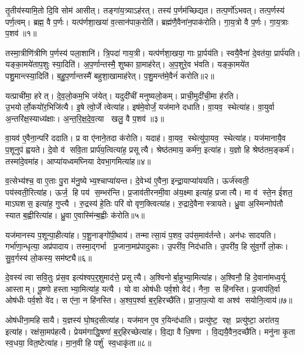 तृ॒तीय॑स्यामि॒तो दि॒वि सोम॑ आसीत्।
तङ्गा॑य॒त्र्याऽह॑रत्।
तस्य॑ प॒र्णम॑च्छिद्यत।
तत्प॒र्णो॑ऽभवत्।
तत्प॒र्णस्य॑ पर्ण॒त्वम्।
ब्रह्म॒ वै प॒र्णः।
यत्प॑र्णशा॒खया॑ व॒त्सान॑पाक॒रोति॑।
ब्रह्म॑णै॒वैना॑न॒पाक॑रोति।
गा॒य॒त्रो वै प॒र्णः।
गा॒य॒त्राः प॒शव॑॥१॥

तस्मा॒त्रीणि॑त्रीणि प॒र्णस्य॑ पला॒शानि॑।
त्रि॒पदा॑ गाय॒त्री।
यत्प॑र्णशा॒खया॒ गाः प्रा॒र्पय॑ति।
स्वयै॒वैना॑ दे॒वत॑या॒ प्रार्प॑यति।
यङ्का॒मये॑ताप॒शुः स्या॒दिति॑।
अ॒प॒र्णान्तस्मै॒ शुष्काग्रा॒माह॑रेत्।
अ॒प॒शुरे॒व भ॑वति।
यङ्का॒मये॑त पशु॒मान्त्स्या॒दिति॑।
ब॒हु॒प॒र्णान्तस्मै॑ बहुशा॒खामाह॑रेत्।
प॒शु॒मन्त॑मे॒वैनं॑ करोति॥२॥

यत्प्राची॑मा॒ हरेत्।
दे॒व॒लो॒कम॒भि ज॑येत्।
यदुदी॑चीं मनुष्यलो॒कम्।
प्राची॒मुदी॑ची॒मा ह॑रति।
उ॒भयोर्लो॒कयो॑र॒भिजि॑त्यै।
इ॒षे त्वो॒र्जे त्वेत्या॑ह।
इष॑मे॒वोर्जं॒ यज॑माने दधाति।
वा॒यव॒ स्थेत्या॑ह।
वा॒युर्वा अ॒न्तरि॑क्ष॒स्याध्य॑क्षाः।
अ॒न्त॒रि॒क्ष॒दे॒व॒त्या खलु॒ वै प॒शव॑॥३॥

वा॒यव॑ ए॒वैना॒न्परि॑ ददाति।
प्र वा ए॑नाने॒तदा क॑रोति।
यदाह॑।
वा॒यव॒ स्थेत्यु॑पा॒यव॒ स्थेत्या॑ह।
यज॑मानायै॒व प॒शूनुप॑ ह्वयते।
दे॒वो व॑ सवि॒ता प्रार्प॑य॒त्वित्या॑ह॒ प्रसूत्यै।
श्रेष्ठ॑तमाय॒ कर्म॑ण॒ इत्या॑ह।
य॒ज्ञो हि श्रेष्ठ॑तम॒ङ्कर्म॑।
तस्मा॑दे॒वमा॑ह।
आप्या॑यध्वमघ्निया देवभा॒गमित्या॑ह॥४॥

व॒त्सेभ्य॑श्च॒ वा ए॒ताः पु॒रा म॑नु॒ष्येभ्य॒श्चाप्या॑यन्त।
दे॒वेभ्य॑ ए॒वैना॒ इन्द्रा॒याप्या॑ययति।
ऊर्ज॑स्वती॒ पय॑स्वती॒रित्या॑ह।
ऊर्ज॒ हि पय॑ स॒म्भर॑न्ति।
प्र॒जाव॑तीरनमी॒वा अ॑य॒क्ष्मा इत्या॑ह॒ प्रजात्यै।
मा व॑ स्ते॒न ई॑शत॒ माऽघशस॒ इत्या॑ह॒ गुप्त्यै।
रु॒द्रस्य॑ हे॒तिः परि॑ वो वृण॒क्त्वित्या॑ह।
रु॒द्रादे॒वैनास्त्रायते।
ध्रु॒वा अ॒स्मिन्गोप॑तौ स्यात ब॒ह्वीरित्या॑ह।
ध्रु॒वा ए॒वास्मि॑न्ब॒ह्वीः क॑रोति॥५॥

यज॑मानस्य प॒शून्पा॒हीत्या॑ह।
प॒शू॒नाङ्गो॑पी॒थाय॑।
तन्मात्सा॒यं प॒शव॒ उप॑स॒माव॑र्तन्ते।
अन॑धः सादयति।
गर्भा॑णा॒न्धृत्या॒ अप्र॑पादाय।
तस्मा॒द्गर्भा प्र॒जाना॒मप्र॑पादुकाः।
उ॒परी॑व॒ निद॑धाति।
उ॒परी॑व॒ हि सु॑व॒र्गो लो॒कः।
सु॒व॒र्गस्य॑ लो॒कस्य॒ सम॑ष्ट्यै॥६॥\anuvakamend[प॒शव॑ करोति प॒शवो॑ देवभा॒गमित्या॑ह करोति॒ नव॑ च]

दे॒वस्य॑ त्वा सवि॒तुः प्र॑स॒व इत्य॑श्वप॒र्॒शुमाद॑त्ते॒ प्रसूत्यै।
अ॒श्विनोर्बा॒हुभ्या॒मित्या॑ह।
अ॒श्विनौ॒ हि दे॒वाना॑मध्व॒र्यू आस्ताम्।
पू॒ष्णो हस्ताभ्या॒मित्या॑ह॒ यत्यै।
यो वा ओष॑धीः पर्व॒शो वेद॑।
नैना॒ स हि॑नस्ति।
प्र॒जाप॑ति॒र्वा ओष॑धीः पर्व॒शो वे॑द।
स ए॑ना॒ न हि॑नस्ति।
अ॒श्व॒प॒र्श्वा ब॒र्॒हिरच्छै॑ति।
प्रा॒जा॒प॒त्यो वा अश्व॑ सयोनि॒त्वाय॑॥७॥

ओष॑धीना॒महिसायै।
य॒ज्ञस्य॑ घो॒षद॒सीत्या॑ह।
यज॑मान ए॒व र॒यिन्द॑धाति।
प्रत्यु॑ष्ट॒ रक्ष॒ प्रत्यु॑ष्टा॒ अरा॑तय॒ इत्या॑ह।
रक्ष॑सा॒मप॑हत्यै।
प्रेयम॑गाद्धि॒षणा॑ ब॒र्॒हिरच्छेत्या॑ह।
वि॒द्या वै धि॒षणा।
वि॒द्ययै॒वैन॒दच्छै॑ति।
मनु॑ना कृ॒ता स्व॒धया॒ वित॒ष्टेत्या॑ह।
मा॒न॒वी हि पर्\mbox{}शु॑ स्व॒धाकृ॑ता॥८॥

